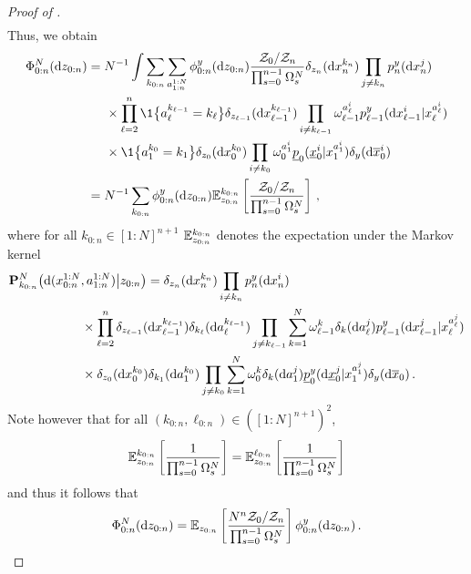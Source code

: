 \begin{proof}[Proof of ]
\begin{align*}
     \end{align*}
     Thus, we obtain
    \begin{align*} 
        \bfilter{0:n}{N}{\rmd z_{0:n}} & = N^{-1} \int \sum_{k_{0:n}} \sum_{\ianc{1:N}{1:n}} \filter{0:n}{y}{\rmd z_{0:n}} \frac{\normconst_0 / \normconst_n}{\prod_{s = 0}^{n-1} \sumweight{s}} \delta_{z_n}(\rmd \iparticle{k_n}{n}) \prod_{j \neq k_n} \bwopt{n}{y}{}{}(\rmd \iparticle{j}{n})  \\
        & \hspace{.5cm} \times \prod_{\ell = 2}^n \1\big\{ \ianc{k_{\ell-1}}{\ell} = k_\ell \big\} \delta_{z_{\ell -1}}(\rmd \iparticle{k_{\ell-1}}{\ell-1}) \prod_{i \neq k_{\ell-1}} \weight{\ianc{i}{\ell}}{\ell-1} \bwopt{\ell-1}{y}{\iparticle{\ianc{i}{\ell}}{\ell}}{\rmd \iparticle{i}{\ell-1}}  \\
        & \hspace{.5cm} \times \1 \big\{ \ianc{k_0}{1} = k_1 \big\} \delta_{z_0}(\rmd \lstate^{k_0} _0) \prod_{i \neq k_0} \weight{\ianc{i}{1}}{0} \bbwtrans{}{0}{\lstate^{\ianc{i}{1}} _1}{\lbottomstate^i _0} \delta_\lmeas(\rmd \ltopstate^i _0) \\
        & = N^{-1} \sum_{k_{0:n}} \filter{0:n}{y}{\rmd z_{0:n}} \pE^{k_{0:n}} _{z_{0:n}} \left[ \frac{\normconst_0 / \normconst_n}{\prod_{s = 0}^{n-1} \sumweight{s}} \right] \eqsp,
    \end{align*}
    where for all $k_{0:n} \in [1:N]^{n+1}$ $\mathbb{E}^{k_{0:n}} _{z_{0:n}}$ denotes the expectation under the Markov kernel 
    \begin{align*}
    & \lawcSMC{k_{0:n}}\big(\rmd (\iparticle{1:N}{0:n}, \ianc{1:N}{1:n})\big| z_{0:n} \big) =  \delta_{z_n}(\rmd \iparticle{k_n}{n}) \prod_{i \neq k_n} \bwopt{n}{y}{}{}(\rmd \iparticle{i}{n}) \\
     & \hspace{2cm} \times\prod_{\ell = 2}^n \delta_{z_{\ell -1}}(\rmd \iparticle{k_{\ell-1}}{\ell-1}) \delta_{k_\ell}(\rmd \ianc{k _{\ell-1}}{\ell}) \prod_{j \neq k_{\ell-1}} \sum_{k = 1}^N \weight{k}{\ell-1} \delta_k(\rmd \ianc{j}{\ell}) \bwopt{\ell-1}{y}{\iparticle{\ianc{j}{\ell}}{\ell}}{\rmd \iparticle{j}{\ell-1}} \\
     & \hspace{2cm} \times \delta_{z_0}(\rmd \lstate^{k_0} _{0}) \delta_{k_1}(\rmd \ianc{k_0}{1}) \prod_{j \neq k_0} \sum_{k = 1}^N \weight{k}{0} \delta_k(\rmd \ianc{j}{1}) \bbwopt{0}{y}{\iparticle{\ianc{j}{1}}{1}}{\rmd \lbottomstate^j _0} \delta_\lmeas(\rmd \ltopstate_0)\eqsp.
    \end{align*}
    Note however that for all $(k_{0:n}, \ell_{0:n}) \in ([1:N]^{n+1})^2$, \[ 
        \mathbb{E}^{k_{0:n}} _{z_{0:n}} \left[ \frac{1}{\prod_{s = 0}^{n-1} \Omega^N _{s}} \right] = \mathbb{E}^{\ell_{0:n}} _{z_{0:n}} \left[ \frac{1}{\prod_{s = 0}^{n-1} \Omega^N _{s}} \right]
        \] 
    and thus it follows that
    \begin{equation} 
        \bfilter{0:n}{N}{\rmd z_{0:n}} = \pE _{z_{0:n}} \left[ \frac{N^{n} \normconst_0 / \normconst_n}{\prod_{s = 0}^{n-1} \sumweight{s}} \right] \filter{0:n}{y}{\rmd z_{0:n}} \eqsp.
    \end{equation}
\end{proof}
